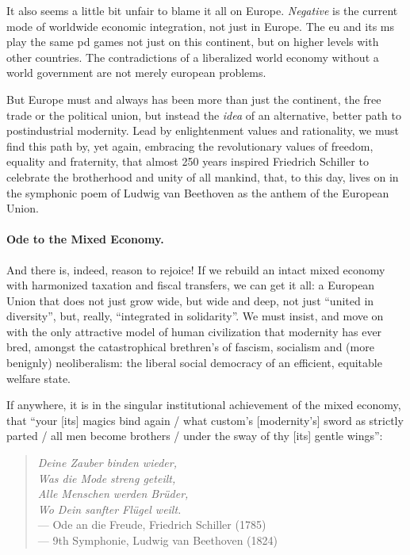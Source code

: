 It also seems a little bit unfair to blame it all on Europe.
\emph{Negative} is the current mode of worldwide economic integration, not just in Europe.
The \gls{eu} and its \gls{ms} play the same \gls{pd} games not just on this continent, but on higher levels with other countries.
The contradictions of a liberalized world economy without a world government are not merely european problems.

But Europe must and always has been more than just the continent, the free trade or the political union, but instead the \emph{idea} of an alternative, better path to postindustrial modernity.
Lead by enlightenment values and rationality, we must find this path by, yet again, embracing the revolutionary values of freedom, equality and fraternity, that almost 250 years inspired Friedrich Schiller to celebrate the brotherhood and unity of all mankind, that, to this day, lives on in the symphonic poem of Ludwig van Beethoven as the anthem of the European Union.

\paragraph{Ode to the Mixed Economy.}
And there is, indeed, reason to rejoice! If we rebuild an intact mixed economy with harmonized taxation and fiscal transfers, we can get it all:
a European Union that does not just grow wide, but wide and deep, not just ``united in diversity'', but, really, ``integrated in solidarity''.
We must insist, and move on with the only attractive model of human civilization that modernity has ever bred, amongst the catastrophical brethren's of fascism, socialism and (more benignly) neoliberalism:
the liberal social democracy of an efficient, equitable welfare state.

If anywhere, it is in the singular institutional achievement of the mixed economy, that ``your [its] magics bind again / what custom's [modernity's] sword as strictly parted / all men become brothers / under the sway of thy [its] gentle wings'':
\begin{verse}
	\emph{Deine Zauber binden wieder,}\\
	\emph{Was die Mode streng geteilt,}\\
	\emph{Alle Menschen werden Br\"{u}der,}\\
	\emph{Wo Dein sanfter Fl\"{u}gel weilt.}\\
	--- Ode an die Freude, Friedrich Schiller (1785)\\
	--- 9th Symphonie, Ludwig van Beethoven (1824)
\end{verse}

